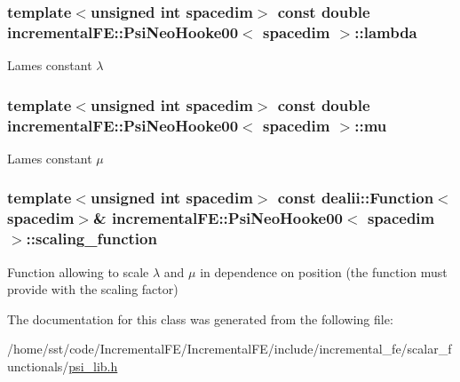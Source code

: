 \subsubsection[{\texorpdfstring{lambda}{lambda}}]{\setlength{\rightskip}{0pt plus 5cm}template$<$unsigned int spacedim$>$ const double {\bf incremental\+F\+E\+::\+Psi\+Neo\+Hooke00}$<$ spacedim $>$\+::lambda\hspace{0.3cm}{\ttfamily [private]}}\hypertarget{classincremental_f_e_1_1_psi_neo_hooke00_a8d6349afc4a3053f86b33db165a9a158}{}\label{classincremental_f_e_1_1_psi_neo_hooke00_a8d6349afc4a3053f86b33db165a9a158}
Lame\textquotesingle{}s constant $\lambda$ 
\subsubsection[{\texorpdfstring{mu}{mu}}]{\setlength{\rightskip}{0pt plus 5cm}template$<$unsigned int spacedim$>$ const double {\bf incremental\+F\+E\+::\+Psi\+Neo\+Hooke00}$<$ spacedim $>$\+::mu\hspace{0.3cm}{\ttfamily [private]}}\hypertarget{classincremental_f_e_1_1_psi_neo_hooke00_a73d67e211d564b621cfbd934ab1e2924}{}\label{classincremental_f_e_1_1_psi_neo_hooke00_a73d67e211d564b621cfbd934ab1e2924}
Lame\textquotesingle{}s constant $\mu$ 
\subsubsection[{\texorpdfstring{scaling\+\_\+function}{scaling_function}}]{\setlength{\rightskip}{0pt plus 5cm}template$<$unsigned int spacedim$>$ const dealii\+::\+Function$<$spacedim$>$\& {\bf incremental\+F\+E\+::\+Psi\+Neo\+Hooke00}$<$ spacedim $>$\+::scaling\+\_\+function\hspace{0.3cm}{\ttfamily [private]}}\hypertarget{classincremental_f_e_1_1_psi_neo_hooke00_afa1ee9fcb2f0f52c12c07845844e1ed0}{}\label{classincremental_f_e_1_1_psi_neo_hooke00_afa1ee9fcb2f0f52c12c07845844e1ed0}
Function allowing to scale $\lambda$ and $\mu$ in dependence on position (the function must provide with the scaling factor) 

The documentation for this class was generated from the following file\+:\begin{DoxyCompactItemize}
\item 
/home/sst/code/\+Incremental\+F\+E/\+Incremental\+F\+E/include/incremental\+\_\+fe/scalar\+\_\+functionals/\hyperlink{psi__lib_8h}{psi\+\_\+lib.\+h}\end{DoxyCompactItemize}

